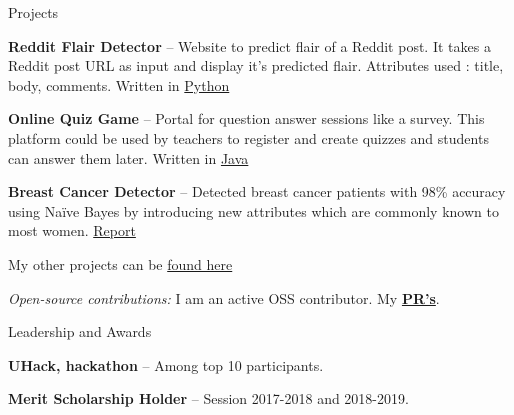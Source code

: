 \documentclass{resume} %
\begin{document}
\begin{rSection}{Projects}
  \begin{rProjectSection}
    \item \textbf {Reddit Flair Detector} -- Website to predict flair of a Reddit post. It takes a Reddit post URL as input and display it's predicted flair. Attributes used : title, body, comments. Written in \href{https://github.com/siddhi523/reddit_flair_detector_}{Python}
    \vspace{3mm}
    \item \textbf {Online Quiz Game} --  Portal for question answer sessions like a survey. This platform could be used by teachers to register and create quizzes and students can answer them later. Written in \href{https://github.com/siddhi523/Online_Quiz_Game}{Java}
    \vspace{3mm}
    \item \textbf {Breast Cancer Detector} -- Detected breast cancer patients with 98\% accuracy using Naïve Bayes by introducing new attributes which are commonly known to most women. \href{https://www.semanticscholar.org/paper/Empirical-Analysis-of-Cervical-and-Breast-Cancer-Kaur-Pruthi/28fd7fd826460167a685b29cf3f56cfe83da1cb6}{Report}
    \vspace{3mm}
    \item My other projects can be \href{https://github.com/siddhi523?tab=repositories}{found here}
  \end{rProjectSection}

  \begin{rBlurbSection}
    \item {\em Open-source contributions:}
      I am an active OSS contributor. My \href{https://github.com/pulls}{\textbf{PR's}}.
  \end{rBlurbSection}
\end{rSection}


\begin{rSection}{Leadership and Awards}
  \begin{rProjectSection}
    \item \textbf {UHack, hackathon} -- Among top 10 participants.
  \end{rProjectSection}
  \begin{rProjectSection}
    \item \textbf {Merit Scholarship Holder} -- Session 2017-2018 and 2018-2019.
  \end{rProjectSection}

\end{rSection}
\end{document}
